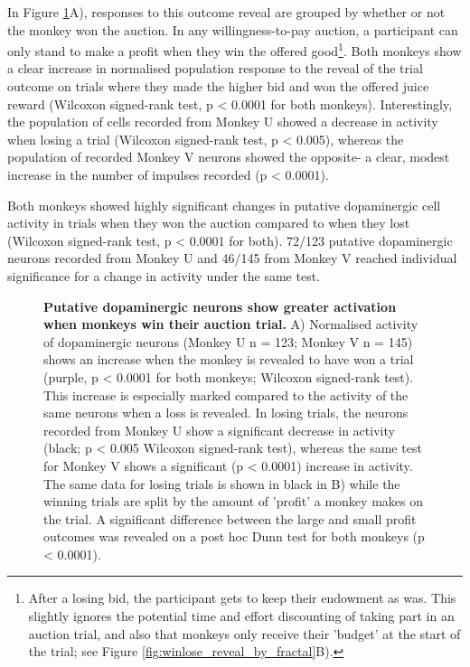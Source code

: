 In Figure \ref{fig:winlose_reveal}A), responses to this outcome reveal are grouped by whether or not the monkey won the auction. In any willingness-to-pay auction, a participant can only stand to make a profit when they win the offered good\footnote{After a losing bid, the participant gets to keep their endowment as was. This slightly ignores the potential time and effort discounting of taking part in an auction trial, and also that monkeys only receive their 'budget' at the start of the trial; see Figure \ref{fig:winlose_reveal_by_fractal}B).}. Both monkeys show a clear increase in normalised population response to the reveal of the trial outcome on trials where they made the higher bid and won the offered juice reward (Wilcoxon signed-rank test, p < 0.0001 for both monkeys). Interestingly, the population of cells recorded from Monkey U showed a decrease in activity when losing a trial (Wilcoxon signed-rank test, p < 0.005), whereas the population of recorded Monkey V neurons showed the opposite- a clear, modest increase in the number of impulses recorded (p < 0.0001). 

Both monkeys showed highly significant changes in putative dopaminergic cell activity in trials when they won the auction compared to when they lost (Wilcoxon signed-rank test, p < 0.0001 for both). 72/123 putative dopaminergic neurons recorded from Monkey U and 46/145 from Monkey V reached individual significance for a change in activity under the same test.

\begin{figure}[p] 
\centering    

\caption[Putative dopaminergic neurons show greater activation when monkeys win their auction trial.]{\textbf{Putative dopaminergic neurons show greater activation when monkeys win their auction trial.} A) Normalised activity of dopaminergic neurons (Monkey U n = 123; Monkey V n = 145) shows an increase when the monkey is revealed to have won a trial (purple, p < 0.0001 for both monkeys; Wilcoxon signed-rank test). This increase is especially marked compared to the activity of the same neurons when a loss is revealed. In losing trials, the neurons recorded from Monkey U show a significant decrease in activity (black; p < 0.005 Wilcoxon signed-rank test), whereas the same test for Monkey V shows a significant (p < 0.0001) increase in activity. The same data for losing trials is shown in black in B) while the winning trials are split by the amount of 'profit' a monkey makes on the trial. A significant difference between the large and small profit outcomes was revealed on a post hoc Dunn test for both monkeys (p < 0.0001).}
\label{fig:winlose_reveal}
\end{figure}

